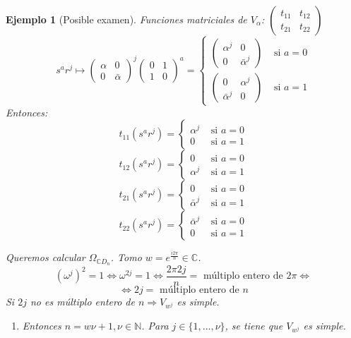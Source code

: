 \documentclass[11pt,a4paper]{article}
\theoremstyle{break}
\newtheorem{example}[theorem]{Ejemplo}
\begin{document}
\begin{example}[Posible examen]
Funciones matriciales de $V_{\alpha}$: $\begin{pmatrix}
t_{11} & t_{12} \\
t_{21} & t_{22}
\end{pmatrix}$
$$s^{a}r^{j} \mapsto \begin{pmatrix}
\alpha & 0 \\
0 & \bar{\alpha}
\end{pmatrix}^{j} \begin{pmatrix}
0 & 1 \\
1 & 0
\end{pmatrix}^{a} = \begin{cases}
\begin{pmatrix}
\alpha^{j} & 0 \\
0 & \bar{\alpha}^{j}
\end{pmatrix} & \text{ si } a = 0 \\
\begin{pmatrix}
0 & \alpha^{j} \\
\bar{\alpha}^{j} & 0
\end{pmatrix} & \text{ si } a = 1
\end{cases}$$
Entonces:
$$t_{11}(s^{a}r^{j}) = \begin{cases}
\alpha^{j} & \text{ si } a = 0 \\
0 & \text{ si } a = 1
\end{cases}$$
$$t_{12}(s^{a}r^{j}) = \begin{cases}
0 & \text{ si } a = 0 \\
\alpha^{j} & \text{ si } a = 1
\end{cases}$$
$$t_{21}(s^{a}r^{j}) = \begin{cases}
0 & \text{ si } a = 0 \\
\bar{\alpha}^{j} & \text{ si } a = 1
\end{cases}$$
$$t_{22}(s^{a}r^{j}) = \begin{cases}
\bar{\alpha}^{j} & \text{ si } a = 0 \\
0 & \text{ si } a = 1
\end{cases}$$


Queremos calcular $\Omega_{\mathbb{C}D_{n}}$. Tomo $w = e^{\frac{i2\pi}{n}} \in \mathbb{C}$.
$$(\omega^{j})^{2} = 1 \iff \omega^{2j} = 1 \iff \frac{2 \pi 2 j}{n} = \text{ múltiplo entero de } 2\pi \iff$$
$$\iff 2j = \text{ múltiplo entero de } n$$
Si $2j$ no es múltiplo entero de $n \Rightarrow V_{w^{j}}$ es simple.

\begin{enumerate}
\item [($n$ impar)] Entonces $n = w \nu + 1, \nu \in \mathbb{N}$. Para $j \in \{1, \dots, \nu\}$, se tiene que $V_{w^{j}}$ es simple.


\end{enumerate}
\end{example}
\end{document}
